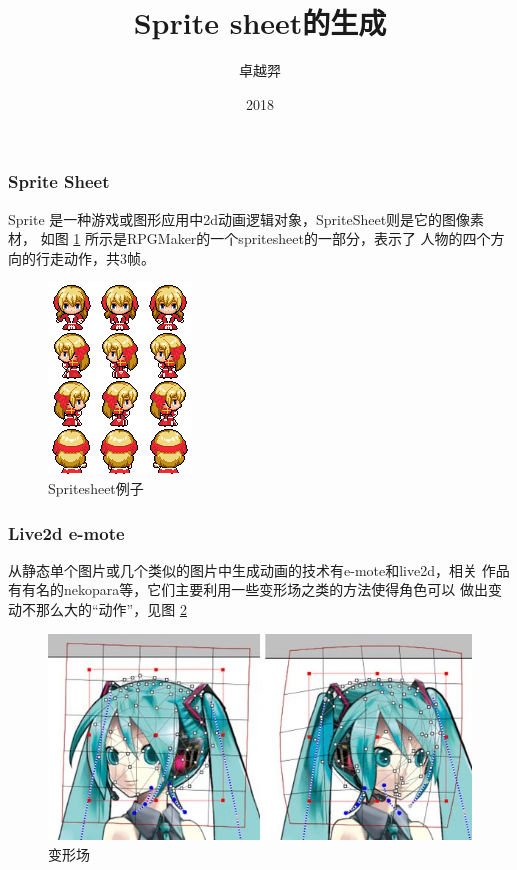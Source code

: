 \documentclass{beamer}
\title{Sprite sheet的生成 }
\author{卓越羿}
\institute[NUST]{}
\date{2018}
\begin{document}
\frame{\titlepage}

\begin{frame}

\frametitle{Sprite Sheet}

Sprite 是一种游戏或图形应用中2d动画逻辑对象，SpriteSheet则是它的图像素材，
如图 \ref{fig:highpriest} 所示是RPGMaker的一个spritesheet的一部分，表示了
人物的四个方向的行走动作，共3帧。

\begin{figure}[htb]
    \centering
    \includegraphics[width=0.3\linewidth]{H.png}
    \caption{Spritesheet例子}
    \label{fig:highpriest}
\end{figure}

\end{frame}

\begin{frame}

\frametitle{Live2d e-mote}

从静态单个图片或几个类似的图片中生成动画的技术有e-mote和live2d，相关
作品有有名的nekopara等，它们主要利用一些变形场之类的方法使得角色可以
做出变动不那么大的“动作”，见图 \ref{fig:miku} 

\begin{figure}[htb]
    \centering
    \includegraphics[width=0.7\linewidth]{miku.jpg}
    \caption{变形场}
    \label{fig:miku}
\end{figure}

\end{frame}
\end{document}
